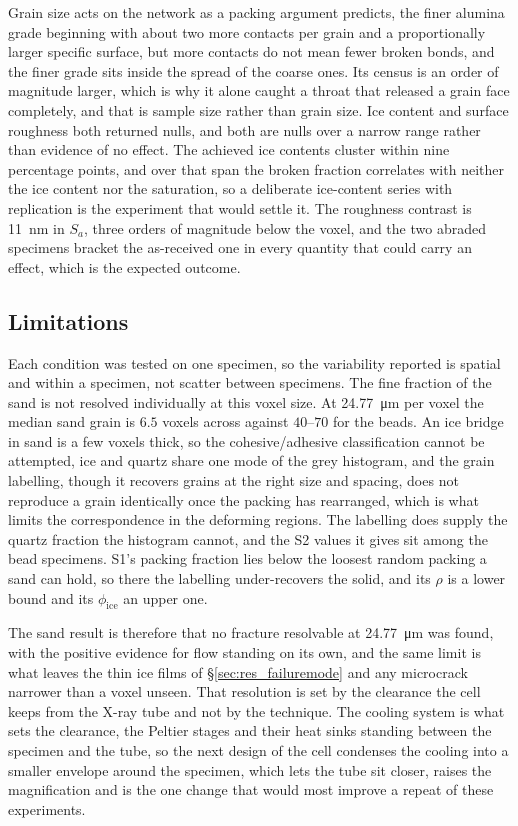 \documentclass[preprint,12pt,numbers]{elsarticle}
\begin{document}
  Grain size acts on the network as a packing argument predicts, the finer
  alumina grade beginning with about two more contacts per grain and a
  proportionally larger specific surface, but more contacts do not mean fewer
  broken bonds, and the finer grade sits inside the spread of the coarse ones.
  Its census is an order of magnitude larger, which is why it alone caught a
  throat that released a grain face completely, and that is sample size rather
  than grain size.  Ice content and surface roughness both returned nulls,
  and both are nulls over a narrow range rather than evidence of no effect.
  The achieved ice contents cluster within nine percentage points, and over
  that span the broken fraction correlates with neither the ice content nor
  the saturation, so a deliberate ice-content series with replication is the
  experiment that would settle it.  The roughness contrast is
  \SI{11}{\nano\meter} in $S_a$, three orders of magnitude below the voxel,
  and the two abraded specimens bracket the as-received one in every quantity
  that could carry an effect, which is the expected outcome.

  \subsection{Limitations}
  \label{sec:disc_limitations}
  \label{sec:disc_sandres}
  Each condition was tested on one specimen, so the variability reported is
  spatial and within a specimen, not scatter between specimens.  The fine
  fraction of the sand is not resolved individually at this voxel size.  At
  \SI{24.77}{\micro\meter} per voxel the median sand grain is $6.5$ voxels
  across against $40$--$70$ for the beads.  An ice bridge in sand is a few
  voxels thick, so the cohesive/adhesive classification cannot be attempted,
  ice and quartz share one mode of the grey histogram, and the grain
  labelling, though it recovers grains at the right size and spacing, does not
  reproduce a grain identically once the packing has rearranged, which is what
  limits the correspondence in the deforming regions.  The labelling does
  supply the quartz fraction the histogram cannot, and the S2 values it gives
  sit among the bead specimens.  S1's packing fraction lies below the loosest
  random packing a sand can hold, so there the labelling under-recovers the
  solid, and its $\rho$ is a lower bound and its $\phi_\mathrm{ice}$ an upper
  one.

  The sand result is therefore that no fracture resolvable at
  \SI{24.77}{\micro\meter} was found, with the positive evidence for flow
  standing on its own, and the same limit is what leaves the thin ice films
  of \S\ref{sec:res_failuremode} and any microcrack narrower than a voxel
  unseen.  That resolution is set by the clearance the cell keeps from the
  X-ray tube and not by the technique.  The cooling system is what sets the
  clearance, the Peltier stages and their heat sinks standing between the
  specimen and the tube, so the next design of the cell condenses the cooling
  into a smaller envelope around the specimen, which lets the tube sit closer,
  raises the magnification and is the one change that would most improve a
  repeat of these experiments.
\end{document}
